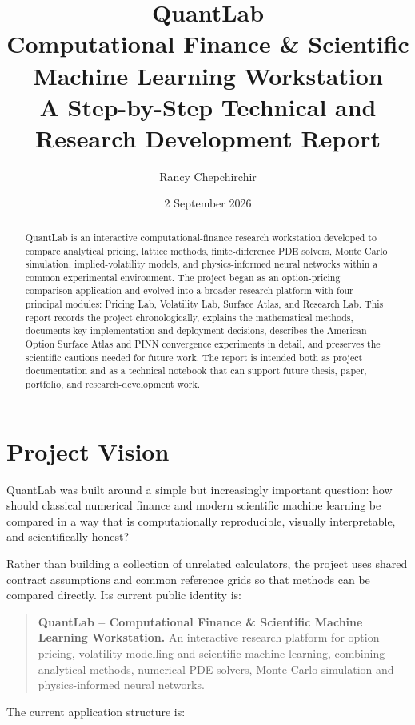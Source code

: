 \documentclass[11pt,a4paper]{article}
\title{\textbf{QuantLab}\\[0.4em]
\Large Computational Finance \& Scientific Machine Learning Workstation\\[0.8em]
\large A Step-by-Step Technical and Research Development Report}
\author{Rancy Chepchirchir}
\date{2 September 2026}
\begin{document}
\maketitle

\begin{abstract}
QuantLab is an interactive computational-finance research workstation developed to compare analytical pricing, lattice methods, finite-difference PDE solvers, Monte Carlo simulation, implied-volatility models, and physics-informed neural networks within a common experimental environment. The project began as an option-pricing comparison application and evolved into a broader research platform with four principal modules: Pricing Lab, Volatility Lab, Surface Atlas, and Research Lab. This report records the project chronologically, explains the mathematical methods, documents key implementation and deployment decisions, describes the American Option Surface Atlas and PINN convergence experiments in detail, and preserves the scientific cautions needed for future work. The report is intended both as project documentation and as a technical notebook that can support future thesis, paper, portfolio, and research-development work.
\end{abstract}

\tableofcontents
\newpage

\section{Project Vision}

QuantLab was built around a simple but increasingly important question: how should classical numerical finance and modern scientific machine learning be compared in a way that is computationally reproducible, visually interpretable, and scientifically honest?

Rather than building a collection of unrelated calculators, the project uses shared contract assumptions and common reference grids so that methods can be compared directly. Its current public identity is:

\begin{quote}
\textbf{QuantLab -- Computational Finance \& Scientific Machine Learning Workstation.} An interactive research platform for option pricing, volatility modelling and scientific machine learning, combining analytical methods, numerical PDE solvers, Monte Carlo simulation and physics-informed neural networks.
\end{quote}

The current application structure is:
\end{document}
